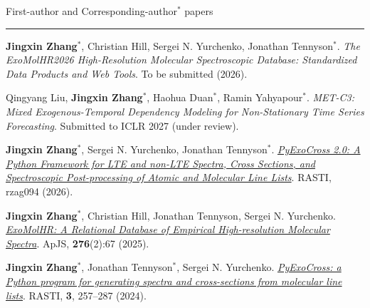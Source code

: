 \documentclass{settings} %
\renewenvironment{rSection}[1]{
\sectionskip
\textcolor{RoyalPurple}{#1}
\sectionlineskip
\hrule
\begin{list}{}{
\setlength{\leftmargin}{1.5em}
}
\item[]
}{
\end{list}
}
\begin{document}

\begin{rSection}{First-author and Corresponding-author$^*$ papers} 

\item \textbf{Jingxin Zhang}$^*$, Christian Hill, Sergei N. Yurchenko, Jonathan Tennyson$^*$. 
\textit{The ExoMolHR2026 High-Resolution Molecular Spectroscopic Database: Standardized Data Products and Web Tools}. 
To be submitted (2026).

\item Qingyang Liu, \textbf{Jingxin Zhang}$^*$, Haohua Duan$^*$, Ramin Yahyapour$^*$. 
\textit{MET-C3: Mixed Exogenous-Temporal Dependency Modeling for Non-Stationary Time Series Forecasting}. 
Submitted to ICLR 2027 (under review).

\item \textbf{Jingxin Zhang}$^*$, Sergei N. Yurchenko, Jonathan Tennyson$^*$. 
\href{https://doi.org/10.1093/rasti/rzag094}{\textit{PyExoCross 2.0: A Python Framework for LTE and non-LTE Spectra, Cross Sections, and Spectroscopic Post-processing of Atomic and Molecular Line Lists}}. 
RASTI, rzag094 (2026).

\item \textbf{Jingxin Zhang}$^*$, Christian Hill, Jonathan Tennyson, Sergei N. Yurchenko.
\href{https://doi.org/10.3847/1538-4365/ada288}{\textit{ExoMolHR: A Relational Database of Empirical High-resolution Molecular Spectra}}. 
ApJS, \textbf{276}(2):67 (2025). 

\item \textbf{Jingxin Zhang}$^*$, Jonathan Tennyson$^*$, Sergei N. Yurchenko. 
\href{https://doi.org/10.1093/rasti/rzae016}{\textit{PyExoCross: a Python program for generating spectra and cross-sections from molecular line lists}}.
RASTI, \textbf{3}, 257--287 (2024). 

\end{rSection}


\end{document}

